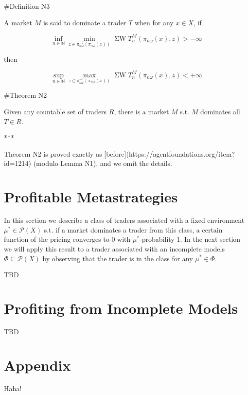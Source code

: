 \documentclass[a4paper]{article}
\newcommand{\Nats}{\mathbb{N}}
\newcommand{\Prob}{\mathcal{P}}
\newcommand{\SW}{\operatorname{\Sigma W}}
\begin{document}
\#Definition N3

A market ${M}$ is said to dominate a trader ${T}$ when for any ${x \in X}$, if

$$\inf_{n \in \Nats} \min_{z \in \pi_{n\omega}^{-1}(\pi_{n\omega}(x))} \SW T^M_n(\pi_{n\omega}(x),z) > -\infty$$

then

$$\sup_{n \in \Nats} \max_{z \in \pi_{n\omega}^{-1}(\pi_{n\omega}(x))} \SW T^M_n(\pi_{n\omega}(x),z) < +\infty$$

\#Theorem N2

Given any countable set of traders $R$, there is a market ${M}$ s.t. ${M}$ dominates all ${T \in R}$.

***

Theorem N2 is proved exactly as [before](https://agentfoundations.org/item?id=1214) (modulo Lemma N1), and we omit the details.

\section{Profitable Metastrategies}

In this section we describe a class of traders associated with a fixed environment ${\mu^* \in \Prob(X)}$ s.t. if a market dominates a trader from this class, a certain function of the pricing converges to 0 with ${\mu^*}$-probability 1. In the next section we will apply this result to a trader associated with an incomplete models ${\Phi \subseteq \Prob(X)}$ by observing that the trader is in the class for any ${\mu^* \in \Phi}$.

TBD

\section{Profiting from Incomplete Models}

TBD

\section{Appendix}

Haha!
\end{document}
